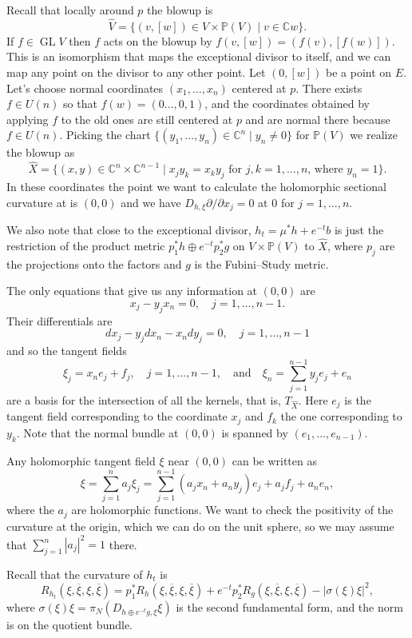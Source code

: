 \documentclass[10pt,a4paper]{amsart}
\newcommand{\kk}[1]{\mathbb{#1}}
\def\qandq{\quad\text{and}\quad}
\def\ov#1{\overline{#1}}
\DeclareMathOperator{\GL}{GL}
\def\hsc{holomorphic sectional curvature}
\def\bl#1{\widehat{#1}}
\def\blX{\bl{X}}
\begin{document}
Recall that locally around $p$ the blowup is
$$
\bl V
= \{ (v,[w]) \in V \times \kk P(V) \mid v \in \kk C w \}.
$$
If $f \in \GL V$ then $f$ acts on the blowup by $f(v, [w]) = (f(v), [f(w)])$.
This is an isomorphism that maps the exceptional divisor to itself, and we can
map any point on the divisor to any other point.
Let $(0, [w])$ be a point on $E$.
Let's choose normal coordinates $(x_1,\ldots,x_n)$ centered at $p$.
There exists $f \in U(n)$ so that $f(w) = (0 \ldots, 0, 1)$, and the
coordinates obtained by applying $f$ to the old ones are still centered at $p$
and are normal there because $f \in U(n)$.
Picking the chart $\{(y_1, \ldots, y_n) \in \kk C^n \mid y_n \not= 0 \}$ for
$\kk P(V)$
we realize the blowup as
$$
\bl X
= \{ (x,y) \in \kk C^n \times \kk C^{n-1}
\mid x_j y_k = x_k y_j \text{ for $j,k = 1,\ldots,n$, where $y_n = 1$}  \}.
$$
In these coordinates the point we want to calculate the \hsc{} at is $(0,0)$
and we have $D_{h,\xi} \partial / \partial x_j = 0$ at $0$ for $j = 1, \ldots, n$.

We also note that close to the exceptional divisor, $h_t = \mu^* h + e^{-t} b$ is
just the restriction of the product metric $p_1^* h \oplus e^{-t} p_2^* g$ on
$V \times \kk P(V)$ to $\bl X$, where $p_j$ are the projections onto the
factors and $g$ is the Fubini--Study metric.

The only equations that give us any information at $(0,0)$ are
$$
x_j - y_j x_n = 0, \quad j = 1, \ldots, n-1.
$$
Their differentials are
$$
dx_j - y_j dx_n - x_n dy_j = 0, \quad j=1,\ldots,n-1
$$
and so the tangent fields
$$
\xi_j = x_n e_j + f_j,
\quad j=1,\ldots,n-1,
\qandq
\xi_n = \sum_{j=1}^{n-1} y_j e_j + e_n
$$
are a basis for
the intersection of all the kernels, that is, $T_{\blX}$.
Here $e_j$ is the tangent field corresponding to the coordinate $x_j$
and $f_k$ the one corresponding to $y_k$.
Note that the normal bundle at $(0,0)$ is spanned by $(e_1, \ldots, e_{n-1})$.

Any holomorphic tangent field $\xi$ near $(0,0)$ can be written as
$$
\xi = \sum_{j=1}^n a_j \xi_j
= \sum_{j=1}^{n-1} (a_j x_n + a_n y_j) e_j + a_j f_j
+ a_n e_n,
$$
where the $a_j$ are holomorphic functions.
We want to check the positivity of the curvature at the origin, which we can do
on the unit sphere, so we may assume that $\sum_{j=1}^n |a_j|^2 = 1$ there.

Recall that the curvature of $h_t$ is
$$
R_{h_t}(\xi, \ov\xi, \xi, \ov\xi)
= p_1^* R_h(\xi, \ov\xi, \xi, \ov\xi)
+ e^{-t} p_2^* R_g(\xi, \ov\xi, \xi, \ov\xi)
- |\sigma(\xi)\xi|^2,
$$
where $\sigma(\xi)\xi = \pi_N(D_{h \oplus e^{-t} g,\xi} \xi)$ is the second
fundamental form, and the norm is on the quotient bundle.
\end{document}
